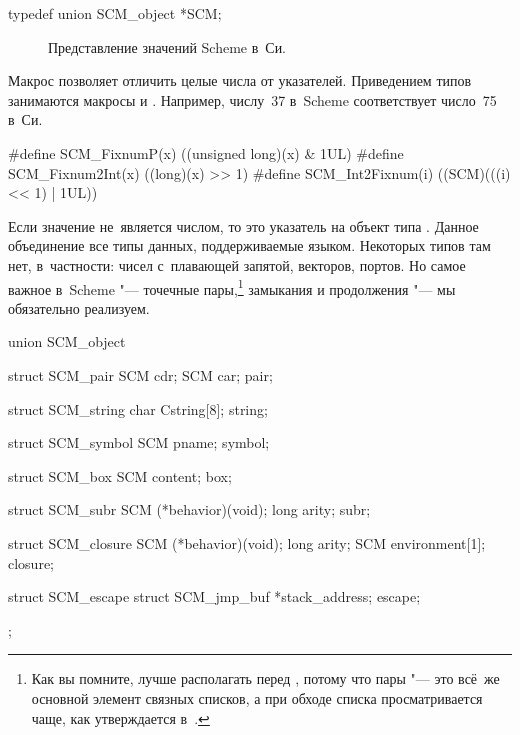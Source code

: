 \begin{code:c}
typedef union SCM_object *SCM;
\end{code:c}

\begin{figure}\centering

\caption{Представление значений Scheme в~Си.}%
\label{cc/data/pic:tagptr}
\end{figure}

Макрос  позволяет отличить целые числа от указателей.
Приведением типов занимаются макросы  и
. Например, числу~37 в~Scheme соответствует число~75 в~Си.

\begin{code:c}
#define SCM_FixnumP(x)    ((unsigned long)(x) & 1UL)
#define SCM_Fixnum2Int(x) ((long)(x) >> 1)
#define SCM_Int2Fixnum(i) ((SCM)(((i) << 1) | 1UL))
\end{code:c}

Если значение  не~является числом, то это указатель на объект типа
. Данное объединение все типы данных, поддерживаемые языком.
Некоторых типов там нет, в~частности: чисел с~плавающей запятой, векторов,
портов. Но самое важное в~Scheme "--- точечные пары,\footnote*{Как вы помните,
 лучше располагать перед , потому что пары "--- это всё~же
основной элемент связных списков, а  при обходе списка просматривается
чаще, как утверждается в~\cite{cla79}.} замыкания и продолжения "--- мы
обязательно реализуем.

\begin{code:c}
union SCM_object {
    struct SCM_pair {
        SCM cdr;
        SCM car;
    } pair;
    
    struct SCM_string {
        char Cstring[8];
    } string;
    
    struct SCM_symbol {
        SCM pname;
    } symbol;

    struct SCM_box {
        SCM content;
    } box;

    struct SCM_subr {
        SCM (*behavior)(void);
        long arity;
    } subr;

    struct SCM_closure {
        SCM (*behavior)(void);
        long arity;
        SCM environment[1];
    } closure;

    struct SCM_escape {
        struct SCM_jmp_buf *stack_address;
    } escape;
};
\end{code:c}

